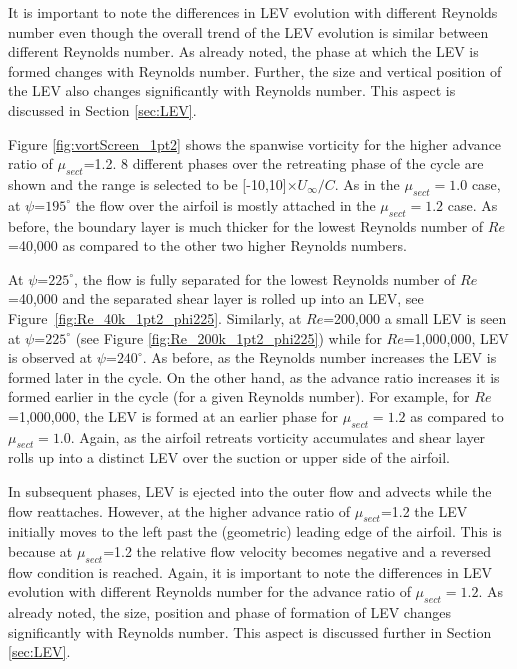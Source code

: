 It is important to note the differences in LEV evolution with different Reynolds number even though the overall trend of the LEV evolution is similar between different Reynolds number.
As already noted, the phase at which the LEV is formed changes with Reynolds number.
Further, the size and vertical position of the LEV also changes significantly with Reynolds number.
This aspect is discussed in Section \ref{sec:LEV}.

Figure \ref{fig:vortScreen_1pt2} shows the spanwise vorticity for the higher advance ratio of $\mu_{sect}$=1.2.
8 different phases over the retreating phase of the cycle are shown and the range is selected to be [-10,10]$\times U_\infty /C$.
As in the $\mu_{sect}=1.0$ case, at $\psi$=$195^\circ$ the flow over the airfoil is mostly attached in the $\mu_{sect}=1.2$ case.
As before, the boundary layer is much thicker for the lowest Reynolds number of $Re$=40,000 as compared to the other two higher Reynolds numbers.

At $\psi$=$225^\circ$, the flow is fully separated for the lowest Reynolds number of $Re$=40,000 and the separated shear layer is rolled up into an LEV, see Figure~\ref{fig:Re_40k_1pt2_phi225}.
Similarly, at $Re$=200,000 a small LEV is seen at $\psi$=$225^\circ$ (see Figure \ref{fig:Re_200k_1pt2_phi225}) while for $Re$=1,000,000, LEV is observed at $\psi$=$240^\circ$.
As before, as the Reynolds number increases the LEV is formed later in the cycle.
On the other hand, as the advance ratio increases it is formed earlier in the cycle (for a given Reynolds number).
For example, for $Re$=1,000,000, the LEV is formed at an earlier phase for $\mu_{sect}=1.2$ as compared to $\mu_{sect}=1.0$.
Again, as the airfoil retreats vorticity accumulates and shear layer rolls up into a distinct LEV over the suction or upper side of the airfoil.

In subsequent phases, LEV is ejected into the outer flow and advects while the flow reattaches.
However, at the higher advance ratio of $\mu_{sect}$=1.2 the LEV initially moves to the left past the (geometric) leading edge of the airfoil.
This is because at $\mu_{sect}$=1.2 the relative flow velocity becomes negative and a reversed flow condition is reached.
Again, it is important to note the differences in LEV evolution with different Reynolds number for the advance ratio of $\mu_{sect}=1.2$.
As already noted, the size, position and phase of formation of LEV changes significantly with Reynolds number.
This aspect is discussed further in Section \ref{sec:LEV}.


